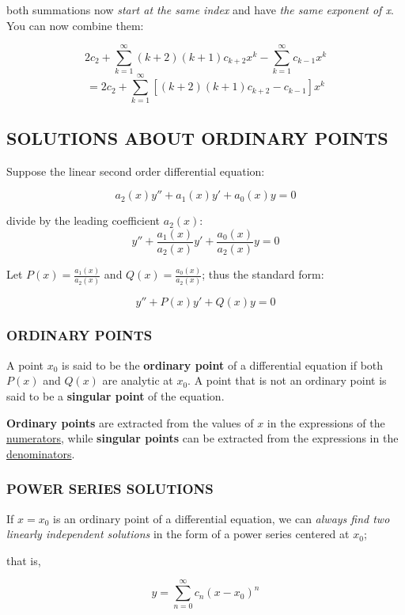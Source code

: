 \documentclass{article}
\begin{document}
both summations now \textit{start at the same index} and have \textit{the same exponent of x}. You can now combine them:

\[2c_2 + \sum_{k=1}^{\infty}(k+2)(k+1)c_{k+2} x^{k} - \sum_{k=1}^{\infty} c_{k-1} x^{k}\]
\[= 2c_2 + \sum_{k=1}^{\infty}[(k+2)(k+1)c_{k+2}  - c_{k-1} ] x^{k}\]

\subsection{SOLUTIONS ABOUT ORDINARY POINTS}

Suppose the linear second order differential equation:

\[a_2(x)y'' + a_1(x)y' + a_0(x)y = 0\]\vspace{0.5cm}

divide by the leading coefficient \(a_2(x)\):
\[y'' + \frac{a_1(x)}{a_2(x)}y' + \frac{a_0(x)}{a_2(x)} y = 0\]

Let \(P(x) = \frac{a_1(x)}{a_2(x)}\) and \(Q(x) = \frac{a_0(x)}{a_2(x)}\); thus the standard form:

\[y'' + P(x)y' + Q(x)y = 0\]

\subsubsection{ORDINARY POINTS}

A point \(x_0\) is said to be the \textbf{ordinary point} of a differential equation if both \(P(x)\) and \(Q(x)\) are analytic at \(x_0\).
A point that is not an ordinary point is said to be a \textbf{singular point} of the equation. \vspace{0.5cm}

\textbf{Ordinary points} are extracted from the values of \(x\) in the expressions of the \underline{numerators}, while \textbf{singular points} can be extracted from
the expressions in the \underline{denominators}.


\subsubsection{POWER SERIES SOLUTIONS}

If \(x = x_0\) is an ordinary point of a differential equation, we can \textit{always find two linearly independent solutions} in the form of a power series centered at \(x_0\);\vspace{0.5cm}

that is,

\[y=\sum_{n=0}^{\infty} c_n (x-x_0)^n\]
\end{document}
